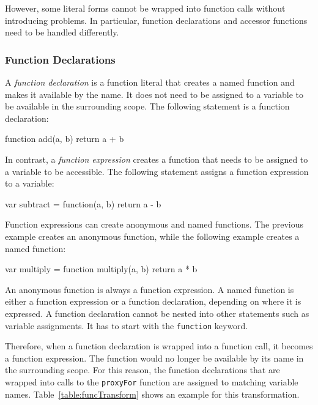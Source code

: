 However, some literal forms cannot be wrapped into function calls without introducing problems.
In particular, function declarations and accessor functions need to be handled differently.


\subsubsection{Function Declarations}

A \emph{function declaration} is a function literal that creates a named function and makes it available by the name.
It does not need to be assigned to a variable to be available in the surrounding scope.
The following statement is a function declaration:

\begin{code}{}{}
function add(a, b) {return a + b}
\end{code}
\iffalse
\end{verbatim}\fi

In contrast, a \emph{function expression} creates a function that needs to be assigned to a variable to be accessible.
The following statement assigns a function expression to a variable:

\begin{code}{}{}
var subtract = function(a, b) {return a - b}
\end{code}
\iffalse
\end{verbatim}\fi

Function expressions can create anonymous and named functions.
The previous example creates an anonymous function, while the following example creates a named function:

\begin{code}{}{}
var multiply = function multiply(a, b) {return a * b}
\end{code}
\iffalse
\end{verbatim}\fi

An anonymous function is always a function expression.
A named function is either a function expression or a function declaration, depending on where it is expressed.
A function declaration cannot be nested into other statements such as variable assignments.
It has to start with the \lstinline{function} keyword.

Therefore, when a function declaration is wrapped into a function call, it becomes a function expression.
The function would no longer be available by its name in the surrounding scope.
For this reason, the function declarations that are wrapped into calls to the \lstinline{proxyFor} function are assigned to matching variable names.
Table~\ref{table:funcTransform} shows an example for this transformation.

